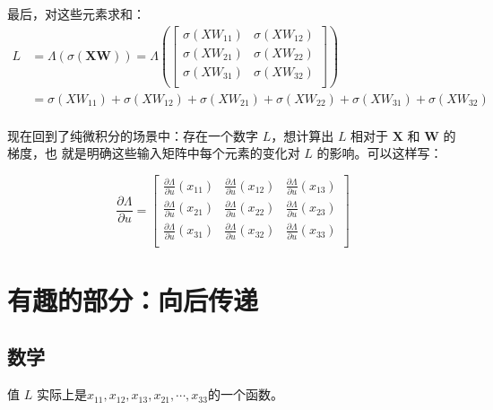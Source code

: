 最后，对这些元素求和：
\begin{equation*}
    \begin{aligned}
        L & =\Lambda(\sigma(\bm{X}\bm{W}))=\Lambda\left(\left[
            \begin{matrix}
                \sigma(XW_{11}) & \sigma(XW_{12}) \\
                \sigma(XW_{21}) & \sigma(XW_{22}) \\
                \sigma(XW_{31}) & \sigma(XW_{32}) \\
            \end{matrix}
        \right]\right)                                                                                       \\
          & =\sigma(XW_{11})+\sigma(XW_{12})+\sigma(XW_{21})+\sigma(XW_{22})+\sigma(XW_{31})+\sigma(XW_{32}) \\
    \end{aligned}
\end{equation*}

现在回到了纯微积分的场景中：存在一个数字 $L$，想计算出 $L$ 相对于 $\bm{X}$ 和 $\bm{W}$ 的梯度，也
就是明确这些输入矩阵中每个元素的变化对 $L$ 的影响。可以这样写：

\begin{equation*}
    \frac{\partial\Lambda}{\partial u}=\left[
        \begin{matrix}
            \frac{\partial\Lambda}{\partial u}(x_{11}) & \frac{\partial\Lambda}{\partial u}(x_{12}) & \frac{\partial\Lambda}{\partial u}(x_{13}) \\
            \frac{\partial\Lambda}{\partial u}(x_{21}) & \frac{\partial\Lambda}{\partial u}(x_{22}) & \frac{\partial\Lambda}{\partial u}(x_{23}) \\
            \frac{\partial\Lambda}{\partial u}(x_{31}) & \frac{\partial\Lambda}{\partial u}(x_{32}) & \frac{\partial\Lambda}{\partial u}(x_{33}) \\
        \end{matrix}
        \right]
\end{equation*}
\section{有趣的部分：向后传递}
\subsection*{数学}
值 $L$ 实际上是$x_{11}, x_{12}, x_{13}, x_{21}, \cdots, x_{33}$的一个函数。

